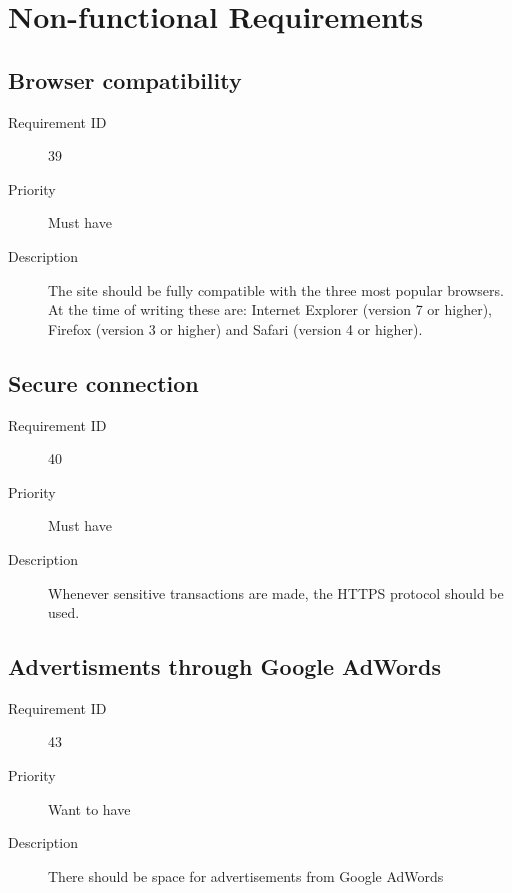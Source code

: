\section{Non-functional Requirements}
	\subsection{Browser compatibility}
		\begin{description}
			\item[Requirement ID] 39
			\item[Priority] Must have
			\item[Description] The site should be fully compatible with the three most popular browsers. At the time of writing these are: Internet Explorer (version 7 or higher), Firefox (version 3 or higher) and Safari (version 4 or higher)\cite{browsers}.
		\end{description}
	\subsection{Secure connection}
		\begin{description}
			\item[Requirement ID] 40
			\item[Priority] Must have
			\item[Description] Whenever sensitive transactions are made, the HTTPS protocol should be used.
		\end{description}
	\subsection{Advertisments through Google AdWords}
		\begin{description}
			\item[Requirement ID] 43
			\item[Priority] Want to have
			\item[Description] There should be space for advertisements from Google AdWords
		\end{description}